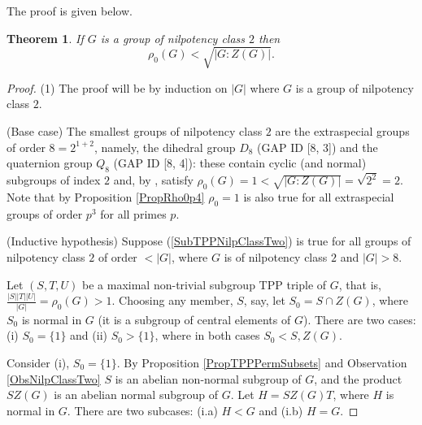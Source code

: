 \documentclass{amsart}
\newtheorem{theorem}{Theorem}[section]
\theoremstyle{observation}
\theoremstyle{definition}
\theoremstyle{remark}
\numberwithin{equation}{section}
\begin{document}
The proof is given below.

\begin{theorem}\label{ThmNilpClassTwo} If $G$ is a group of nilpotency class $2$ then
\begin{equation}\label{SubTPPNilpClassTwo}
\rho_0(G) < \sqrt{|G: Z(G)|}.
\end{equation}
\end{theorem}
\begin{proof}\textup{(1)} The proof will be by induction on $|G|$ where $G$ is a group of nilpotency class $2$.

\vspace{1mm}

(Base case) The smallest groups of nilpotency class $2$ are the extraspecial groups of order $8 = 2^{1 + 2}$, namely, the dihedral group $D_8$ (GAP ID [8, 3]) and the quaternion group $Q_8$ (GAP ID [8, 4]): these contain cyclic (and normal) subgroups of index $2$ and, by \citep[Corollary 4.3]{Mur}, satisfy $\rho_0(G) = 1 < \sqrt{|G:Z(G)|} = \sqrt{2^2} = 2$.  Note that by Proposition \ref{PropRho0p4} $\rho_0 = 1$ is also true for all extraspecial groups of order $p^3$ for all primes $p$.

\vspace{1mm}

(Inductive hypothesis) Suppose (\ref{SubTPPNilpClassTwo}) is true for all groups of nilpotency class $2$ of order $ < |G|$, where $G$ is of nilpotency class $2$ and $|G| > 8$.

\vspace{1mm}

Let $(S, T, U)$ be a maximal non-trivial subgroup TPP triple of $G$, that is, $\frac{|S||T||U|}{|G|} = \rho_0(G) > 1$. Choosing any member, $S$, say, let $S_0 = S \cap Z(G)$, where $S_0$ is normal in $G$ (it is a subgroup of central elements of $G$). There are two cases: \textup{(i)} $S_0 = \{1\}$ and \textup{(ii)} $S_0 > \{1\}$, where in both cases $S_0 < S, Z(G)$.

\vspace{1mm}

Consider \textup{(i)}, $S_0 = \{1\}$. By Proposition \ref{PropTPPPermSubsets} and Observation \ref{ObsNilpClassTwo} $S$ is an abelian non-normal subgroup of $G$, and the product $SZ(G)$ is an abelian normal subgroup of $G$. Let $H = SZ(G)T$, where $H$ is normal in $G$. There are two subcases: \textup{(i.a)} $H < G$ and \textup{(i.b)} $H = G$.

\vspace{1mm}


\end{proof}
\end{document}
